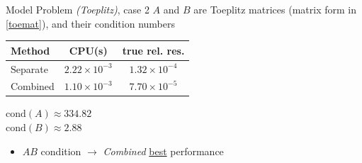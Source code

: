 \documentclass[aspectratio=169]{beamer}
\begin{document}
\begin{frame}{Model Problem \textit{(Toeplitz)}, case 2}
	$A$ and $B$ are Toeplitz matrices (matrix form in \eqref{toemat}), and their condition numbers

	\begin{minipage}[t]{0.63\textwidth}
		\vspace{0pt}
		\centering
		\begin{tabular}{l c c}
			\toprule
			Method & CPU(s) & true rel. res.\\
			\midrule
			Separate& $2.22 \times 10^{-3}$ & \alert{$1.32 \times 10^{-4}$} \\
			Combined& \underline{$1.10 \times 10^{-3}$}& \underline{$7.70 \times 10^{-5}$}\\
			\bottomrule
		\end{tabular}
	\end{minipage}%
	\hfill
	\begin{minipage}[t]{0.33\textwidth}
		\vspace{0pt}
		$\mathrm{cond} (A) \approx 334.82 $\\
		\underline{$\mathrm{cond} (B) \approx 2.88$}\\
	\end{minipage}

	\begin{itemize}
		\item $AB$  condition $\rightarrow$ \textit{Combined} \underline{best} performance
	\end{itemize}
\end{frame}
\end{document}
